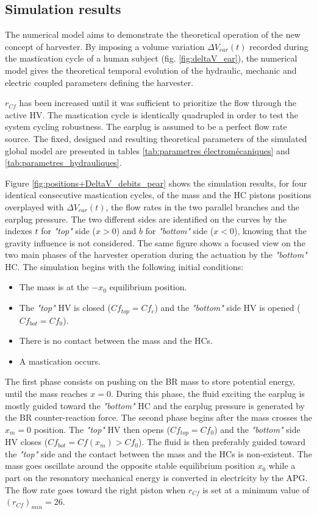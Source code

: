 \documentclass[3p,twocolumn,preprint]{elsarticle}
\begin{document}
	\subsection{Simulation results}	
	\label{subsec:Simulation results}
The numerical model aims to demonstrate the theoretical operation of the new concept of harvester. By imposing a volume variation $\Delta V_{ear}(t)$ recorded during the mastication cycle of a human subject (fig. \ref{fig:deltaV_ear}), the numerical model gives the theoretical temporal evolution of the hydraulic, mechanic and electric coupled parameters defining the harvester. 

$r_{Cf}$ has been increased until it was sufficient to prioritize the flow through the active HV. The mastication cycle is identically quadrupled in order to test the system cycling robustness. The earplug is assumed to be a perfect flow rate source. The fixed, designed and resulting theoretical parameters of the simulated global model are presented in tables \ref{tab:parametres électromécaniques} and \ref{tab:parametres_hydrauliques}.

Figure \ref{fig:positions+DeltaV_debits_pear} shows the simulation results, for four identical consecutive mastication cycles, of the mass and the HC pistons positions overplayed with $\Delta V_{ear}(t)$, the flow rates in the two parallel branches and the earplug pressure. The two different sides are identified on the curves by the indexes $t$ for \emph{"top"} side ($x>0$) and $b$ for \emph{"bottom"} side ($x<0$), knowing that the gravity influence is not considered. The same figure shows a focused view on the two main phases of the harvester operation during the actuation by the \emph{"bottom"} HC. The simulation begins with the following initial conditions:
\begin{itemize}
	\item The mass is at the $-x_0$ equilibrium position.
	\item The \emph{"top"} HV is closed ($Cf_{top} = Cf_c$) and the \emph{"bottom"} side HV is opened ($Cf_{bot} = Cf_0$).
	\item There is no contact between the mass and the HCs.
	\item A mastication occurs.
\end{itemize}

The first phase consists on pushing on the BR mass to store potential energy, until the mass reaches $x=0$. During this phase, the fluid exciting the earplug is mostly guided toward the \emph{"bottom"} HC and the earplug pressure is generated by the BR counter-reaction force. The second phase begins after the mass crosses the $x_m=0$ position. The \emph{"top"} HV then opens ($Cf_{top} = Cf_0$) and the \emph{"bottom"} side HV closes ($Cf_{bot} = Cf(x_m)>Cf_0$). The fluid is then preferably guided toward the \emph{"top"} side and the contact between the mass and the HCs is non-existent. The mass goes oscillate around the opposite stable equilibrium position $x_0$ while a part on the resonatory mechanical energy is converted in electricity by the APG. The flow rate goes toward the right piston when $r_{Cf}$ is set at a minimum value of \mbox{$(r_{Cf})_{min}=26$}. 
\end{document}
